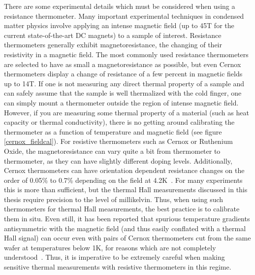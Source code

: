 \documentclass{thesis-umich}
\begin{document}
There are some experimental details which must be considered when using a
resistance thermometer. Many important experimental techniques in condensed
matter physics involve applying an intense magnetic field (up to 45T for the
current state-of-the-art DC magnets) to a sample of interest. Resistance
thermometers generally exhibit magnetoresistance, the changing of their
resistivity in a magnetic field. The most commonly used resistance thermometers
are selected to have as small a magnetoresistance as possible, but even Cernox
thermometers display a change of resistance of a few percent in magnetic fields
up to 14T. If one is not measuring any direct thermal property of a sample and
can safely assume that the sample is well thermalized with the cold finger, one
can simply mount a thermometer outside the region of intense magnetic field.
However, if you are measuring some thermal property of a material (such as heat
capacity or thermal conductivity), there is no getting around calibrating the
thermometer as a function of temperature and magnetic field (see figure
\ref{cernox_fieldcal}). For resistive thermometers such as Cernox or Ruthenium
Oxide, the magnetoresistance can vary quite a bit from thermometer to
thermometer, as they can have slightly different doping levels. Additionally,
Cernox thermometers can have orientation dependent resistance changes on the
order of 0.05\% to 0.7\% depending on the field at 4.2K~\cite{Brandt1999}. For
many experiments this is more than sufficient, but the thermal Hall measurements
discussed in this thesis require precision to the level of millikelvin. Thus,
when using such thermometers for thermal Hall measurements, the best practice
is to calibrate them in situ. Even still, it has been reported that spurious
temperature gradients antisymmetric with the magnetic field (and thus easily
conflated with a thermal Hall signal) can occur even with pairs of Cernox
thermometers cut from the same wafer at temperatures below 1K, for reasons
which are not completely understood~\cite{HirschbergerThesis}. Thus, it is
imperative to be extremely careful when making sensitive thermal measurements
with resistive thermometers in this regime.
\end{document}
